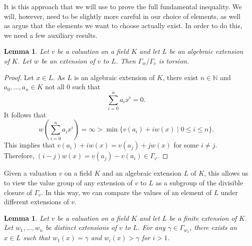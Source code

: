 \documentclass[12pt,a4paper]{amsart}
\newtheorem{lem}[thm]{Lemma}
\theoremstyle{definition}
\begin{document}
It is this approach that we will use to prove the full fundamental inequality.
We will, however, need to be slightly more careful in our choice of elements, as well as argue that the elements we want to choose actually exist.
In order to do this, we need a few auxiliary results.
\begin{lem}
Let $v$ be a valuation on a field $K$ and let $L$ be an algebraic extension of $K$.
Let $w$ be an extension of $v$ to $L$.
Then $\Gamma_w/\Gamma_v$ is torsion.
\end{lem}
\begin{proof}
Let $x\in L$.
As $L$ is an algebraic extension of $K$, there exist $n\in\mathds{N}$ and $a_0,\ldots,a_n\in K$ not all $0$ such that
$$\sum_{i=0}^na_ix^i=0.$$
It follows that $$w\left(\sum_{i=0}^na_ix^i\right)=\infty>\min\{v(a_i)+iw(x)\mid0\leq i\leq n\}.$$
This implies that $v(a_i)+iw(x)=v(a_j)+jw(x)$ for some $i\neq j$.
Therefore, $(i-j)w(x)=v(a_j)-v(a_i)\in\Gamma_v$.
\end{proof}
Given a valuation $v$ on a field $K$ and an algebraic extension $L$ of $K$,
this allows us to view the value group of any extension of $v$ to $L$ as a subgroup of the divisible closure of $\Gamma_v$.
In this way, we can compare the values of an element of $L$ under different extensions of $v$.
\begin{lem}{\label{approx}}
Let $v$ be a valuation on a field $K$ and let $L$ be a finite extension of $K$.
Let $w_1,\ldots,w_n$ be distinct extensions of $v$ to $L$.
For any $\gamma\in\Gamma_{w_1}$, there exists an $x\in L$ such that $w_1(x)=\gamma$ and $w_i(x)>\gamma$ for $i>1$.
\end{lem}
\end{document}
